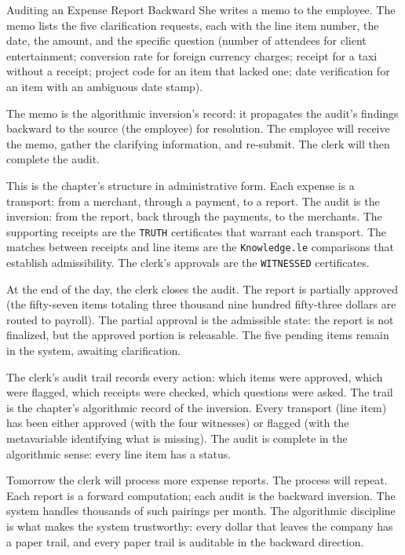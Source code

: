 \begin{coda}{Auditing an Expense Report Backward}
She writes a memo to the employee. The memo lists the five
clarification requests, each with the line item number, the date,
the amount, and the specific question (number of attendees for
client entertainment; conversion rate for foreign currency
charges; receipt for a taxi without a receipt; project code for
an item that lacked one; date verification for an item with an
ambiguous date stamp).

The memo is the algorithmic inversion's record: it propagates
the audit's findings backward to the source (the employee) for
resolution. The employee will receive the memo, gather the
clarifying information, and re-submit. The clerk will then
complete the audit.

This is the chapter's structure in administrative form. Each
expense is a transport: from a merchant, through a payment, to a
report. The audit is the inversion: from the report, back through
the payments, to the merchants. The supporting receipts are the
\texttt{TRUTH} certificates that warrant each transport. The
matches between receipts and line items are the
\texttt{Knowledge.le} comparisons that establish admissibility.
The clerk's approvals are the \texttt{WITNESSED} certificates.

At the end of the day, the clerk closes the audit. The report is
partially approved (the fifty-seven items totaling three thousand
nine hundred fifty-three dollars are routed to payroll). The
partial approval is the admissible state: the report is not
finalized, but the approved portion is releasable. The five
pending items remain in the system, awaiting clarification.

The clerk's audit trail records every action: which items were
approved, which were flagged, which receipts were checked, which
questions were asked. The trail is the chapter's algorithmic
record of the inversion. Every transport (line item) has been
either approved (with the four witnesses) or flagged (with the
metavariable identifying what is missing). The audit is
complete in the algorithmic sense: every line item has a
status.

Tomorrow the clerk will process more expense reports. The
process will repeat. Each report is a forward computation; each
audit is the backward inversion. The system handles thousands of
such pairings per month. The algorithmic discipline is what
makes the system trustworthy: every dollar that leaves the
company has a paper trail, and every paper trail is auditable
in the backward direction.

\end{coda}
